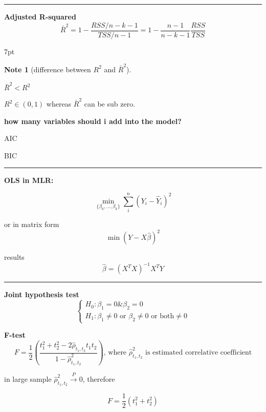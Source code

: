 \documentclass{article}
\newcommand*\sepline{%
  \begin{center}
    \rule[1ex]{.5\textwidth}{.5pt}
  \end{center}}
\newenvironment{blueblock}{
\def\FrameCommand{
  \hspace{1pt}
    {\color{DarkBlue}
    \vrule width 2pt}
    {\color{blueshade}
    \vrule width 4pt}
  \colorbox{blueshade}
}
\MakeFramed{
  \advance
  \hsize-
  \width
  \FrameRestore}
\noindent\hspace{-4.55pt}%
\begin{adjustwidth}{}{7pt}
\vspace{2pt}\vspace{2pt}
}
{\vspace{2pt}\end{adjustwidth}\endMakeFramed}
\newtheorem{note}{Note}
\begin{document}
\sepline

\textbf{Adjusted R-squared}
\begin{equation}
  \bar R^2=1-\frac{RSS/n-k-1}{TSS/n-1}=1-\frac{n-1}{n-k-1}\frac{RSS}{TSS}
\end{equation}

\begin{blueblock}
\begin{note}[difference between $R^2$ and $\bar R^2$]
\end{note}
$\bar R^2<R^2$

$R^2 \in (0,1)$ whereas $\bar R^2 $ can be sub zero.
\end{blueblock}


\textbf{how many variables should i add into the model?}

AIC

BIC

\sepline

\textbf{OLS in MLR:}

\begin{equation}
  \min\limits_{\{\beta_0,\dots,\beta_k\}} \sum\limits_i^n (Y_i-\hat Y_i)^2
\end{equation}

or in matrix form
\begin{equation}
  \min (Y-X \hat{\beta} )^2
\end{equation}

results
\begin{equation}
  \hat{\beta}=(X^T X)^{-1}X^T Y
\end{equation}

\sepline

\textbf{Joint hypothesis test}
\begin{equation}
  \begin{cases}
    H_0: \beta_1=0 \& \beta_2=0
    \\
    H_1: \beta_1\neq 0 \text{ or } \beta_2\neq 0\text{ or both} \neq 0 
  \end{cases}
\end{equation}


\textbf{F-test}
\begin{equation}
  F=\frac{1}{2}(\frac{t_1^2+t_2^2-2 \hat \rho_{t_1,t_2} t_1 t_2 }{1-\hat \rho_{t_1,t_2}^2}) \text{, where $\hat\rho_{t_1,t_2}^2$ is estimated correlative coefficient}
\end{equation}

in large sample $\hat\rho_{t_1,t_2}^2 \stackrel{P}{\rightarrow} 0$, therefore

\begin{equation}
  F=\frac{1}{2}(t_1^2+t_2^2)
\end{equation}
\end{document}
